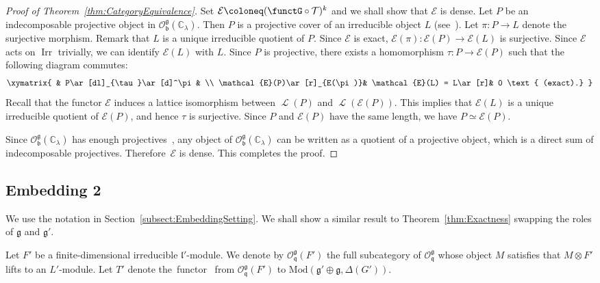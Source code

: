 \documentclass[pdftex]{sigma}
\numberwithin{equation}{section}
\theoremstyle{definition}
\newcommand{\BasicRing}[1]{\mathbb{#1}}
\newcommand{\CC}{\BasicRing{C}}
\newcommand{\Mod}{\mathrm{Mod}}
\newcommand{\lieC}[1]{\mathfrak{#1}}
\newcommand{\lie}[1]{\mathfrak{#1}}
\newcommand{\ind}[2]{\mathrm{ind}^{\lieC{#1}}_{\lieC{#2}}}
\newcommand{\BGGcat}[2]{\mathcal{O}_{\lie{#2}}^{\lie{#1}}}
\newcommand{\zuck}[2]{\Gamma^{#1}_{#2}}
\newcommand{\Dzuck}[3]{R^{#3}\zuck{#1}{#2}}
\DeclareMathOperator{\lattice}{\mathcal{L}}
\DeclareMathOperator{\Irr}{\mathrm{Irr}}
\begin{document}
\begin{proof}[Proof of Theorem~\ref{thm:CategoryEquivalence}]
	Set $\mathcal{E}\coloneq(\functG\circ \mathcal{T})^k$ and we shall show that $\mathcal{E}$ is dense.
	Let $P$ be an indecomposable projective object in $\BGGcat{g}{b}(\CC_\lambda)$.
	Then $P$ is a projective cover of an irreducible object $L$ (see~\cite[Section 3.9]{Hu08_category_o}).
	Let $\pi \colon P\rightarrow L$ denote the surjective morphism.
	Remark that $L$ is a unique irreducible quotient of $P$.
	Since $\mathcal{E}$ is exact, $\mathcal{E}(\pi)\colon \mathcal{E}(P) \rightarrow \mathcal{E}(L)$ is surjective.
	Since $\mathcal{E}$ acts on $\Irr$ trivially, we can identify $\mathcal{E}(L)$ with $L$.
	Since $P$ is projective, there exists a homomorphism $\tau\colon P \rightarrow \mathcal{E}(P)$ such
	that the following diagram commutes:
	\begin{align*}
		\xymatrix{
		& P\ar[dl]_{\tau}\ar[d]^\pi& \\
		\mathcal{E}(P)\ar[r]_{E(\pi)}& \mathcal{E}(L) = L\ar[r]& 0 \text{ (exact).}
		}
	\end{align*}
	Recall that the functor $\mathcal{E}$ induces a lattice isomorphism between $\lattice(P)$ and $\lattice(\mathcal{E}(P))$.
	This implies that $\mathcal{E}(L)$ is a unique irreducible quotient of $\mathcal{E}(P)$, and hence $\tau$ is surjective.
	Since $P$ and $\mathcal{E}(P)$ have the same length, we have $P \simeq \mathcal{E}(P)$.

	Since $\BGGcat{g}{b}(\CC_\lambda)$ has enough projectives~\cite[Section 3.9]{Hu08_category_o},
	any object of $\BGGcat{g}{b}(\CC_\lambda)$
	can be written as a quotient of a projective object, which is a direct sum of indecomposable projectives.
	Therefore~$\mathcal{E}$ is dense.
	This completes the proof.
\end{proof}

\subsection{Embedding 2}

We use the notation in Section~\ref{subsect:EmbeddingSetting}.
We shall show a similar result to Theorem~\ref{thm:Exactness} swapping the roles of $\lie{g}$ and $\lie{g'}$.

Let $F'$ be a finite-dimensional irreducible $\lie{l'}$-module.
We denote by $\BGGcat{g}{q}(F')$ the full subcategory of $\BGGcat{g}{q}$ whose object $M$ satisfies that $M\otimes F'$ lifts to an $L'$-module.
Let $T'$ denote the~func\-tor~\smash{$\Dzuck{\Delta(G')}{\Delta(L')}{S}\bigl(\ind{g'}{q'}(F') \otimes \cdot\bigr)$} from $\BGGcat{g}{q}(F')$ to $\Mod(\lie{g'\oplus g}, \Delta(G'))$.
\end{document}
